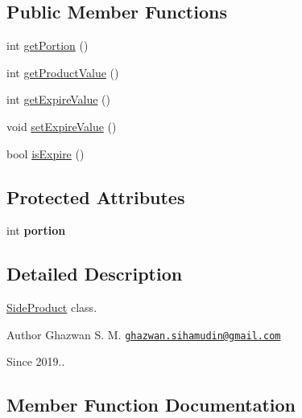 \subsection*{Public Member Functions}
\begin{DoxyCompactItemize}
\item 
int \hyperlink{classSideProduct_a8265dbcfcde3880817bfb8d82e563700}{get\+Portion} ()
\item 
int \hyperlink{classSideProduct_ae37e75482c8ddaf7abe070054fad58eb}{get\+Product\+Value} ()
\item 
int \hyperlink{classSideProduct_a2ea1a135e6456d0220f3ba3d3e8c9dfb}{get\+Expire\+Value} ()
\item 
void \hyperlink{classSideProduct_abff90c90ea13a3511dcd8dbdf55fc33c}{set\+Expire\+Value} ()
\item 
bool \hyperlink{classSideProduct_a9a37b515860c516ec28749f5b562aa0f}{is\+Expire} ()
\end{DoxyCompactItemize}
\subsection*{Protected Attributes}
\begin{DoxyCompactItemize}
\item 
\mbox{\label{classSideProduct_a92b465582932a080a9080e9bc748f104}} 
int {\bfseries portion}
\end{DoxyCompactItemize}


\subsection{Detailed Description}
\hyperlink{classSideProduct}{Side\+Product} class.

\begin{DoxyAuthor}{Author}
Ghazwan S. M. \href{mailto:ghazwan.sihamudin@gmail.com}{\tt ghazwan.\+sihamudin@gmail.\+com} 
\end{DoxyAuthor}
\begin{DoxySince}{Since}
2019.. 
\end{DoxySince}


\subsection{Member Function Documentation}
\mbox{\label{classSideProduct_a2ea1a135e6456d0220f3ba3d3e8c9dfb}} 
